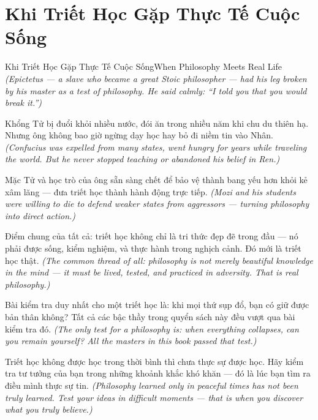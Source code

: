 \section{Khi Triết Học Gặp Thực Tế Cuộc Sống}
\begin{truyen}{Khi Triết Học Gặp Thực Tế Cuộc Sống}{When Philosophy Meets Real Life}
\textit{(Epictetus — a slave who became a great Stoic philosopher — had his leg broken by his master as a test of philosophy. He said calmly: ``I told you that you would break it.'')}

Khổng Tử bị đuổi khỏi nhiều nước, đói ăn trong nhiều năm khi chu du thiên hạ. Nhưng ông không bao giờ ngừng dạy học hay bỏ đi niềm tin vào Nhân.
\textit{(Confucius was expelled from many states, went hungry for years while traveling the world. But he never stopped teaching or abandoned his belief in Ren.)}

Mặc Tử và học trò của ông sẵn sàng chết để bảo vệ thành bang yếu hơn khỏi kẻ xâm lăng — đưa triết học thành hành động trực tiếp.
\textit{(Mozi and his students were willing to die to defend weaker states from aggressors — turning philosophy into direct action.)}

Điểm chung của tất cả: triết học không chỉ là tri thức đẹp đẽ trong đầu — nó phải được sống, kiểm nghiệm, và thực hành trong nghịch cảnh. Đó mới là triết học thật.
\textit{(The common thread of all: philosophy is not merely beautiful knowledge in the mind — it must be lived, tested, and practiced in adversity. That is real philosophy.)}

Bài kiểm tra duy nhất cho một triết học là: khi mọi thứ sụp đổ, bạn có giữ được bản thân không? Tất cả các bậc thầy trong quyển sách này đều vượt qua bài kiểm tra đó.
\textit{(The only test for a philosophy is: when everything collapses, can you remain yourself? All the masters in this book passed that test.)}

\end{truyen}

\begin{baihoc}
Triết học không được học trong thời bình thì chưa thực sự được học. Hãy kiểm tra tư tưởng của bạn trong những khoảnh khắc khó khăn — đó là lúc bạn tìm ra điều mình thực sự tin.
\textit{(Philosophy learned only in peaceful times has not been truly learned. Test your ideas in difficult moments — that is when you discover what you truly believe.)}
\end{baihoc}
\ngancach

